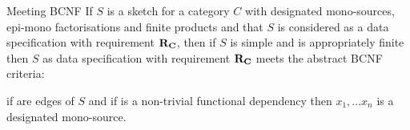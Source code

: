 \begin{frame}{Meeting BCNF}{\slidecontext}
If $S$ is a sketch for a category $C$ with designated mono-sources, epi-mono factorisations  and finite products
and that $S$ is considered as a data specification with requirement $\reqtc$, then 
if $S$ is simple and \catcw is appropriately finite then $S$ as data specification
with requirement $\reqtc$ meets the abstract BCNF criteria:

\pause if  
are edges of $S$
and if   is a non-trivial functional dependency  then
$x_1,...x_n$ is a designated mono-source.
\end{frame}


\iffalse
\begin{frame}{Referential Inclusion Dependencies}{\slidecontext}
\begin{definition}
If $\catc$ is a category with \thirdstructure, if $\reqtc$ is a set of instances 
and if \fnsourceqnsource in $\catc$ and  $\set{q_1,...q_n}$ is a mono-source
 then a \term{referential inclusion dependency} $I$, 
 written $a[f_1,...f_n] \overset{I}{\subseteq} c[q_1,..q_n]$, 
 is a family of functions $I_D)_{D \in \reqtc}$
such that for each instance $D \in \reqtc$, $I_D$ is a function $I_D : D(a) \morph D(c)$ and
for each $i$, $1 \leq i \le n$, $I_D \circ D(q_i) = D(f_i)$.
\end{definition}
\end{frame}

\begin{frame}{Representation of Referential Inclusion Dependencies}{\slidecontext}
\begin{definition}
If $\catc$ is a category with \thirdstructure
and if $\reqtc$ is a set of instances
and \fnsourceqnsource in $\catc$ 
and if $a[f_1,...f_n] \overset{I}{\subseteq} c[q_1,..q_n]$ is a referential inclusion dependency
with respect  to $\reqtc$ 
then say that the inclusion dependency $I$ is \term{represented} in $\catc$
iff there exists a morphism $i:a \morph c$ in $\catc$ such that in each instance $D \in \reqtc$, $D(i) = I_D$. 
\end{definition}
\end{frame}
\fi
